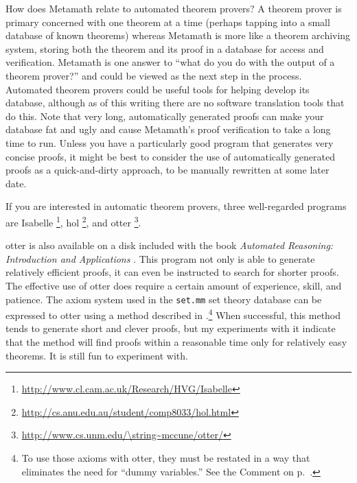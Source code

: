 How does Metamath relate to automated theorem provers?  A
theorem prover is primary concerned with one theorem at a time (perhaps
tapping into a small database of known theorems) whereas Metamath is more like
a theorem archiving system, storing both the theorem and its proof in a
database for access and verification.  Metamath is one answer to ``what do you
do with the output of a theorem prover?''  and could be viewed as the
next step in the process.  Automated theorem provers could be useful tools for
helping develop its database, although as of this writing there are no
software translation tools that do this.  Note that very long, automatically
generated proofs can make your database fat and ugly and cause Metamath's proof
verification to take a long time to run.  Unless you have a particularly good
program that generates very concise proofs, it might be best to consider the
use of automatically generated proofs as a quick-and-dirty approach, to be
manually rewritten at some later date.

If you are interested in automatic theorem provers, three well-regarded
programs are
Isabelle%
\footnote{\url{http://www.cl.cam.ac.uk/Research/HVG/Isabelle}},
{\sc hol}%
\footnote{\url{http://cs.anu.edu.au/student/comp8033/hol.html}},
and {\sc otter}%
\footnote{\url{http://www.cs.unm.edu/\string~mccune/otter/}}.

{\sc otter} is also available on a disk included
with the book {\em Automated Reasoning:  Introduction and Applications}
\cite{Wos}.  This program not only is able to generate
relatively efficient proofs, it can even be instructed to search for
shorter proofs.  The effective use of {\sc otter} does require a certain
amount of experience, skill, and patience.  The axiom system used in the
\texttt{set.mm} set theory
database can be expressed to {\sc otter} using a method described in
\cite{Megill}.\footnote{To use those axioms with
{\sc otter}, they must be restated in a way that eliminates the need for
``dummy variables.'' See the Comment
on p.~\pageref{nodd}.} When successful, this method tends to generate
short and clever proofs, but my experiments with it indicate that the
method will find proofs within a reasonable time only for relatively
easy theorems.  It is still fun to experiment with.

